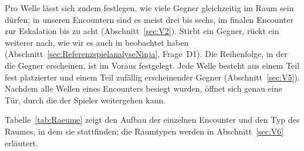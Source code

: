 \documentclass[../Main.tex]{subfiles}
\begin{document}
Pro Welle lässt sich zudem festlegen, wie viele Gegner gleichzeitig im Raum sein dürfen; in unseren Encountern sind es meist drei bis sechs, im finalen Encounter zur Eskalation bis zu acht (Abschnitt~\ref{sec:V2}). Stirbt ein Gegner, rückt ein weiterer nach, wie wir es auch in  beobachtet haben (Abschnitt~\ref{sec:ReferenzspielanalyseNinja}, Frage~D1). Die Reihenfolge, in der die Gegner erscheinen, ist im Voraus festgelegt. Jede Welle besteht aus einem Teil fest platzierter und einem Teil zufällig erscheinender Gegner (Abschnitt~\ref{sec:V5}). Nachdem alle Wellen eines Encounters besiegt wurden, öffnet sich genau eine Tür, durch die der Spieler weitergehen kann.

Tabelle~\ref{tab:Raeume} zeigt den Aufbau der einzelnen Encounter und den Typ des Raumes, in dem sie stattfinden; die Raumtypen werden in Abschnitt~\ref{sec:V6} erläutert.
\end{document}
